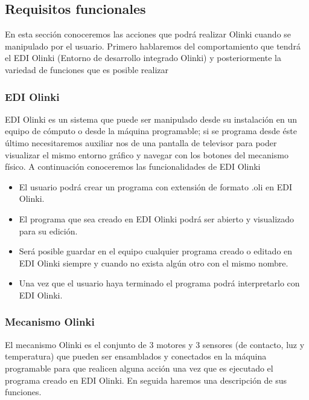 \documentclass[letterpaper,10pt]{article}
\begin{document}
\subsection{Requisitos funcionales}

En esta sección conoceremos las acciones que podrá realizar Olinki cuando se manipulado por el usuario. 
Primero hablaremos del comportamiento que tendrá el EDI Olinki (Entorno de desarrollo integrado Olinki) y posteriormente la variedad de funciones que es posible realizar 

\subsubsection{EDI Olinki}

EDI Olinki es un sistema que puede ser manipulado desde su instalación en un equipo de cómputo o desde la máquina programable; 
si se programa desde éste último  necesitaremos auxiliar nos de una pantalla de televisor para poder visualizar el mismo entorno gráfico y navegar con los botones del mecanismo
físico. A continuación conoceremos las funcionalidades de EDI Olinki
\begin{itemize}

	\item El usuario podrá crear un programa con extensión de formato .oli en EDI Olinki.
	\item El programa que sea creado en EDI Olinki podrá ser abierto y visualizado para su edición.
	\item Será posible guardar en el equipo cualquier programa creado o editado en EDI Olinki siempre y cuando no exista algún otro con el mismo nombre.
	\item Una vez que el usuario haya terminado el programa podrá interpretarlo con EDI Olinki.
\end{itemize}

\subsubsection{Mecanismo Olinki}


El mecanismo Olinki es el conjunto de 3 motores y 3 sensores (de contacto, luz y temperatura) que pueden ser ensamblados y conectados en la máquina programable para que 
realicen alguna acción una vez que es ejecutado el programa creado en EDI Olinki. En seguida haremos una descripción de sus funciones.
\newline
\end{document}

